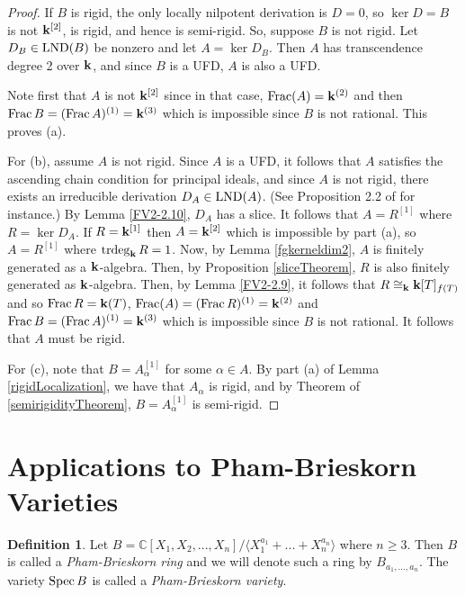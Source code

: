 \documentclass[12pt]{amsart}
\theoremstyle{plain}
\theoremstyle{definition}
\newtheorem{definition}[subsection]{Definition}
\newcommand{\Spec}{		\operatorname{{\rm Spec}}}
\newcommand{\trdeg}{	\operatorname{{\rm trdeg}}}
\newcommand{\Frac}{		\operatorname{{\rm Frac}}}
\newcommand{\lb}{\langle}
\newcommand{\rb}{\rangle}
\newcommand{\Comp}{\ensuremath{\mathbb{C}}}
\newcommand{\bk}{{\ensuremath{\rm \bf k}}}
\newcommand{\lnd}{\operatorname{{\rm LND}}}
\newcommand{\isom}{\cong}
\begin{document}
\begin{proof}
	If $B$ is rigid, the only locally nilpotent derivation is $D = 0$, so $\ker D = B$ is not $\bk^{[2]}$, is rigid, and hence is semi-rigid. So, suppose $B$ is not rigid. Let $D_B \in \lnd(B)$ be nonzero and let $A = \ker D_B$. Then $A$ has transcendence degree 2 over $\bk$, and since $B$ is a UFD, $A$ is also a UFD. 
	
	Note first that $A$ is not $\bk^{[2]}$ since in that case, $\Frac(A) = \bk^{(2)}$ and then $\Frac B = (\Frac A)^{(1)} = \bk^{(3)}$ which is impossible since $B$ is not rational. This proves (a).
	
	For (b), assume $A$ is not rigid. Since $A$ is a UFD, it follows that $A$ satisfies the ascending chain condition for principal ideals, and since $A$ is not rigid, there exists an irreducible derivation $D_A \in \lnd(A)$. (See Proposition 2.2 of \cite{freudenburg2017algebraic} for instance.) By Lemma \ref{FV2-2.10}, $D_A$ has a slice. It follows that $A = R^{[1]}$ where $R = \ker D_A$. If $R = \bk^{[1]}$ then $A = \bk^{[2]}$ which is impossible by part (a), so $A = R^{[1]}$ where $\trdeg_\bk R = 1$. Now, by Lemma \ref{fgkerneldim2}, $A$ is finitely generated as a $\bk$-algebra. Then, by Proposition \ref{sliceTheorem}, $R$ is also finitely generated as $\bk$-algebra. Then, by Lemma \ref{FV2-2.9}, it follows that $R \isom_\bk \bk[T]_{f(T)}$ and so $\Frac R = \bk(T)$, $\Frac(A) = (\Frac R)^{(1)} = \bk^{(2)}$ and $\Frac B = (\Frac A)^{(1)} = \bk^{(3)}$ which is impossible since $B$ is not rational. It follows that $A$ must be rigid.
	
	For (c), note that $B = A_\alpha^{[1]}$ for some $\alpha \in A$. By part (a) of Lemma \ref{rigidLocalization}, we have that $A_\alpha$ is rigid, and by Theorem of \ref{semirigidityTheorem}, $B = A_\alpha^{[1]}$ is semi-rigid.      		
\end{proof}



\section{Applications to Pham-Brieskorn Varieties}

\begin{definition}
Let  $B = \Comp[X_1,X_2,...,X_n]/ \lb X_1^{a_1} + ... + X_n^{a_n} \rb$ where $n \geq 3$.  Then $B$ is called a \textit{Pham-Brieskorn ring} and we will denote such a ring by $B_{a_1, ..., a_n}$.  The variety $\Spec B$ is called a \textit{Pham-Brieskorn variety}.
\end{definition}
\end{document}

